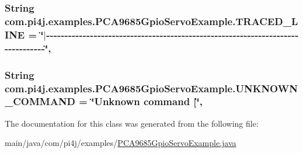 \subsubsection[{T\+R\+A\+C\+E\+D\+\_\+\+L\+I\+N\+E}]{\setlength{\rightskip}{0pt plus 5cm}String com.\+pi4j.\+examples.\+P\+C\+A9685\+Gpio\+Servo\+Example.\+T\+R\+A\+C\+E\+D\+\_\+\+L\+I\+N\+E = \char`\"{}$\vert$-\/-\/-\/-\/-\/-\/-\/-\/-\/-\/-\/-\/-\/-\/-\/-\/-\/-\/-\/-\/-\/-\/-\/-\/-\/-\/-\/-\/-\/-\/-\/-\/-\/-\/-\/-\/-\/-\/-\/-\/-\/-\/-\/-\/-\/-\/-\/-\/-\/-\/-\/-\/-\/-\/-\/-\/-\/-\/-\/-\/-\/-\/-\/-\/-\/-\/-\/-\/-\/-\/-\/-\/-\/-\/-\/-\/-\/-\/-\/-\/\char`\"{}\hspace{0.3cm}{\ttfamily [static]}, {\ttfamily [private]}}\label{classcom_1_1pi4j_1_1examples_1_1PCA9685GpioServoExample_a6ff12704305b8c1c5109be29bf994e4b}
\hypertarget{classcom_1_1pi4j_1_1examples_1_1PCA9685GpioServoExample_a5872e3a5afc895f8265fa55f6fa628e1}{}
\subsubsection[{U\+N\+K\+N\+O\+W\+N\+\_\+\+C\+O\+M\+M\+A\+N\+D}]{\setlength{\rightskip}{0pt plus 5cm}String com.\+pi4j.\+examples.\+P\+C\+A9685\+Gpio\+Servo\+Example.\+U\+N\+K\+N\+O\+W\+N\+\_\+\+C\+O\+M\+M\+A\+N\+D = \char`\"{}Unknown command \mbox{[}\char`\"{}\hspace{0.3cm}{\ttfamily [static]}, {\ttfamily [private]}}\label{classcom_1_1pi4j_1_1examples_1_1PCA9685GpioServoExample_a5872e3a5afc895f8265fa55f6fa628e1}


The documentation for this class was generated from the following file\+:\begin{DoxyCompactItemize}
\item 
main/java/com/pi4j/examples/\hyperlink{PCA9685GpioServoExample_8java}{P\+C\+A9685\+Gpio\+Servo\+Example.\+java}\end{DoxyCompactItemize}
